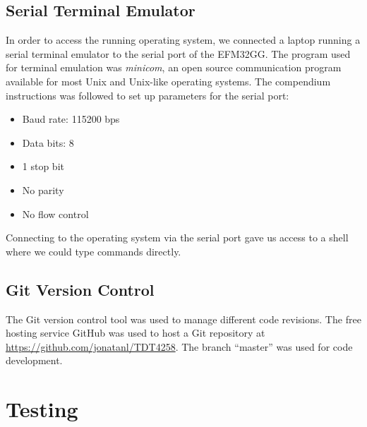 \subsection{Serial Terminal Emulator}
In order to access the running operating system, we connected a laptop running a serial terminal emulator to the serial port of the EFM32GG. The program used for terminal emulation was \emph{minicom}, an open source communication program available for most Unix and Unix-like operating systems.\cite{minicom-man-page} The compendium instructions was followed to set up parameters for the serial port:
\begin{itemize}
  \item Baud rate: 115200 bps
  \item Data bits: 8
  \item 1 stop bit
  \item No parity
  \item No flow control
\end{itemize}
Connecting to the operating system via the serial port gave us access to a shell where we could type commands directly.

\subsection{Git Version Control}
The Git version control tool was used to manage different code revisions. The free hosting service GitHub was used to host a Git repository at \url{https://github.com/jonatanl/TDT4258}. The branch ``master'' was used for code development.



\section{Testing}

